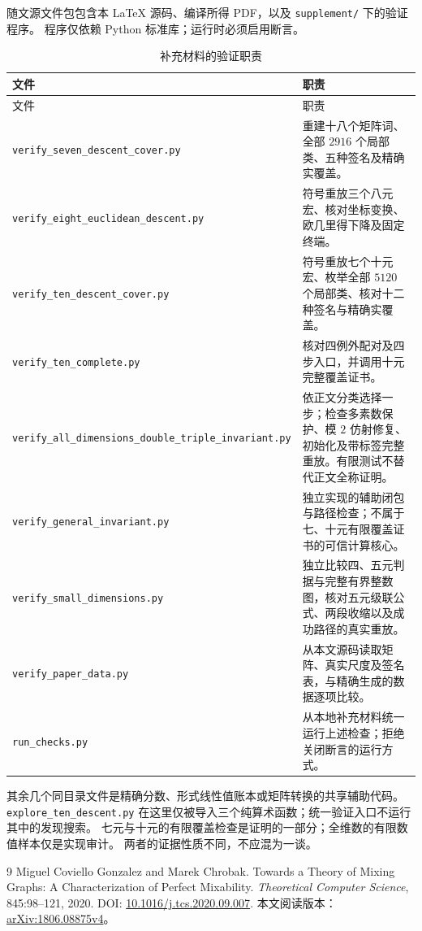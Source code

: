 \documentclass[UTF8,fontset=fandol,zihao=-4,a4paper]{ctexart}
\numberwithin{equation}{section}
\theoremstyle{definition}
\begin{document}
随文源文件包包含本 \LaTeX{} 源码、编译所得 PDF，以及 \texttt{supplement/} 下的验证程序。
程序仅依赖 Python 标准库；运行时必须启用断言。
\begin{longtable}{>{\raggedright\arraybackslash}p{}>{\raggedright\arraybackslash}p{}}
\caption{补充材料的验证职责}\label{tab:supplement}\\
\toprule 文件 & 职责\\\midrule\endfirsthead
\toprule 文件 & 职责\\\midrule\endhead
\nolinkurl{verify_seven_descent_cover.py} & 重建十八个矩阵词、全部 $2916$ 个局部类、五种签名及精确实覆盖。\\
\nolinkurl{verify_eight_euclidean_descent.py} & 符号重放三个八元宏、核对坐标变换、欧几里得下降及固定终端。\\
\nolinkurl{verify_ten_descent_cover.py} & 符号重放七个十元宏、枚举全部 $5120$ 个局部类、核对十二种签名与精确实覆盖。\\
\nolinkurl{verify_ten_complete.py} & 核对四例外配对及四步入口，并调用十元完整覆盖证书。\\
\nolinkurl{verify_all_dimensions_double_triple_invariant.py} & 依正文分类选择一步；检查多素数保护、模 $2$ 仿射修复、初始化及带标签完整重放。有限测试不替代正文全称证明。\\
\nolinkurl{verify_general_invariant.py} & 独立实现的辅助闭包与路径检查；不属于七、十元有限覆盖证书的可信计算核心。\\
\nolinkurl{verify_small_dimensions.py} & 独立比较四、五元判据与完整有界整数图，核对五元级联公式、两段收缩以及成功路径的真实重放。\\
\nolinkurl{verify_paper_data.py} & 从本文源码读取矩阵、真实尺度及签名表，与精确生成的数据逐项比较。\\
\nolinkurl{run_checks.py} & 从本地补充材料统一运行上述检查；拒绝关闭断言的运行方式。\\
\bottomrule
\end{longtable}

其余几个同目录文件是精确分数、形式线性值账本或矩阵转换的共享辅助代码。
\texttt{explore\_ten\_descent.py} 在这里仅被导入三个纯算术函数；统一验证入口不运行其中的发现搜索。
七元与十元的有限覆盖检查是证明的一部分；全维数的有限数值样本仅是实现审计。
两者的证据性质不同，不应混为一谈。

\begin{thebibliography}{9}
Miguel Coviello Gonzalez and Marek Chrobak.
\newblock Towards a Theory of Mixing Graphs: A Characterization of Perfect Mixability.
\newblock \emph{Theoretical Computer Science}, 845:98--121, 2020.
\newblock DOI: \href{https://doi.org/10.1016/j.tcs.2020.09.007}{10.1016/j.tcs.2020.09.007}.
\newblock 本文阅读版本：\href{https://arxiv.org/abs/1806.08875v4}{arXiv:1806.08875v4}。
\end{thebibliography}
\end{document}
